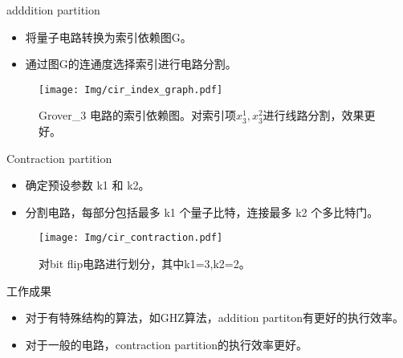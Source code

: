 \documentclass[aspectratio=1610]{ctexbeamer}
\begin{document}
\begin{frame}{adddition partition}
    \begin{itemize}[label=$\bullet$]
        \item 将量子电路转换为索引依赖图G。
        \item 通过图G的连通度选择索引进行电路分割。
    \end{itemize}
    \begin{figure}
        \centering
        \texttt{[image: Img/cir\_index\_graph.pdf]}
        \caption{Grover\_3 电路的索引依赖图。对索引项$x_3^1,x_3^2$进行线路分割，效果更好。}
    \end{figure}
\end{frame}
\begin{frame}{Contraction partition}
    \begin{itemize}[label=$\bullet$]
        \item 确定预设参数 k1 和 k2。
        \item 分割电路，每部分包括最多 k1 个量子比特，连接最多 k2 个多比特门。
    \end{itemize}
    \begin{figure}
        \centering
        \texttt{[image: Img/cir\_contraction.pdf]}
        \caption{对bit flip电路进行划分，其中k1=3,k2=2。}
    \end{figure}
\end{frame}
\begin{frame}{工作成果}
    \begin{table}[]
        \caption{对不同量子算法计算一步迁移的时间消耗}
    \end{table}
    \begin{itemize}[label=$\bullet$]
        \item 对于有特殊结构的算法，如GHZ算法，addition partiton有更好的执行效率。
        \item 对于一般的电路，contraction partition的执行效率更好。
    \end{itemize}
\end{frame}
\end{document}
